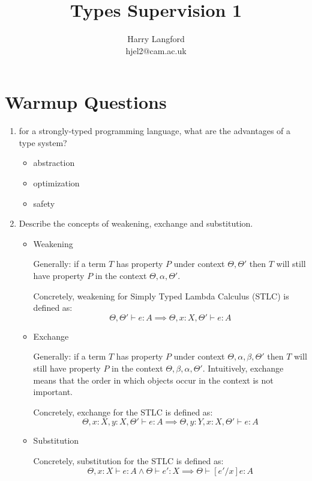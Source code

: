 \documentclass[10pt,\jkfside,a4paper]{article}
\title{Types Supervision 1}
\author{
    Harry Langford \\
    hjel2@cam.ac.uk
}
\begin{document}
\section{Warmup Questions}

\begin{enumerate}

    \item for a strongly-typed programming language, what are the advantages of a type system?

    \begin{itemize}

        \item abstraction

        \item optimization

        \item safety

    \end{itemize}

    \item Describe the concepts of weakening, exchange and substitution.

    \begin{itemize}

        \item Weakening

        Generally: if a term $T$ has property $P$ under context $\Theta, \Theta'$ then $T$ will still have property $P$ in the context $\Theta, \alpha, \Theta'$.

        Concretely, weakening for Simply Typed Lambda Calculus (STLC) is defined as:
        \[
            \Theta, \Theta' \vdash e: A \implies \Theta, x: X, \Theta' \vdash e: A
        \]

        \item Exchange

        Generally: if a term $T$ has property $P$ under context $\Theta, \alpha, \beta, \Theta'$ then $T$ will still have property $P$ in the context $\Theta, \beta, \alpha, \Theta'$.
        Intuitively, exchange means that the order in which objects occur in the context is not important.

        Concretely, exchange for the STLC is defined as:
        \[
            \Theta, x: X, y: X, \Theta' \vdash e: A \implies \Theta, y: Y, x: X, \Theta' \vdash e: A
        \]

        \item Substitution

        Concretely, substitution for the STLC is defined as:
        \[
            \Theta, x: X \vdash e: A \land \Theta \vdash e': X \implies \Theta \vdash [e'/x]e : A
        \]


\end{itemize}
\end{enumerate}
\end{document}
